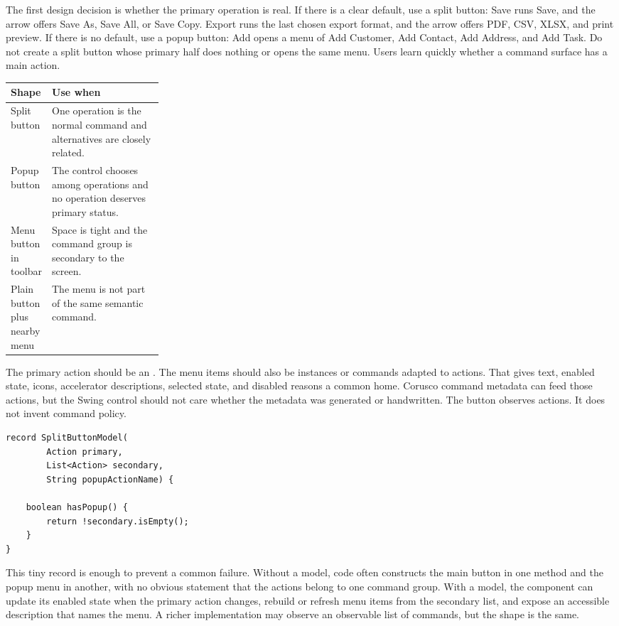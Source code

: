 The first design decision is whether the primary operation is real. If there is a clear
default, use a split button: Save runs Save, and the arrow offers Save As, Save All, or
Save Copy. Export runs the last chosen export format, and the arrow offers PDF, CSV,
XLSX, and print preview. If there is no default, use a popup button: Add opens a menu of
Add Customer, Add Contact, Add Address, and Add Task. Do not create a split button whose
primary half does nothing or opens the same menu. Users learn quickly whether a command
surface has a main action.

\begin{tabularx}{0.96\linewidth}{@{}p{0.25\linewidth}X@{}}
\toprule
Shape & Use when\\
\midrule
Split button & One operation is the normal command and alternatives are closely related.\\
Popup button & The control chooses among operations and no operation deserves primary status.\\
Menu button in toolbar & Space is tight and the command group is secondary to the screen.\\
Plain button plus nearby menu & The menu is not part of the same semantic command.\\
\bottomrule
\end{tabularx}

The primary action should be an
. The menu items should
also be
 instances or commands adapted to actions. That gives text,
enabled state, icons, accelerator descriptions, selected state, and disabled reasons a
common home. Corusco command metadata can feed those actions, but the Swing control
should not care whether the metadata was generated or handwritten. The button observes
actions. It does not invent command policy.

\begin{lstlisting}[caption={A split button model separates primary and menu actions.}]
record SplitButtonModel(
        Action primary,
        List<Action> secondary,
        String popupActionName) {

    boolean hasPopup() {
        return !secondary.isEmpty();
    }
}
\end{lstlisting}

This tiny record is enough to prevent a common failure. Without a model, code often
constructs the main button in one method and the popup menu in another, with no obvious
statement that the actions belong to one command group. With a model, the component can
update its enabled state when the primary action changes, rebuild or refresh menu items
from the secondary list, and expose an accessible description that names the menu. A
richer implementation may observe an observable list of commands, but the shape is the
same.

